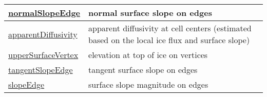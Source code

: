 {\begin{center}
\begin{longtable}{| p{2.0in} | p{4.0in} |}
    \hline
    \hyperref[subsec:var_sec_geometry_normalSlopeEdge]{normalSlopeEdge} & normal surface slope on edges \\
    \hline
    \hyperref[subsec:var_sec_geometry_apparentDiffusivity]{apparentDiffusivity} & apparent diffusivity at cell centers (estimated based on the local ice flux and surface slope) \\
    \hline
    \hyperref[subsec:var_sec_geometry_upperSurfaceVertex]{upperSurfaceVertex} & elevation at top of ice on vertices \\
    \hline
    \hyperref[subsec:var_sec_geometry_tangentSlopeEdge]{tangentSlopeEdge} & tangent surface slope on edges \\
    \hline
    \hyperref[subsec:var_sec_geometry_slopeEdge]{slopeEdge} & surface slope magnitude on edges \\
    \hline
\end{longtable}
\end{center}
}
